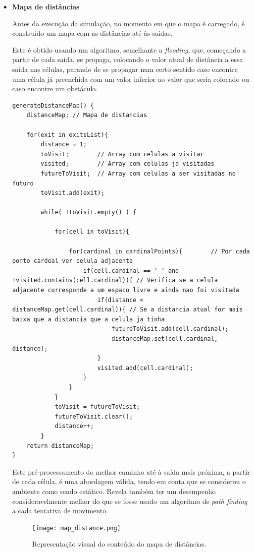 \documentclass[12pt]{article}
\begin{document}
\begin{titlepage}
\begin{itemize}
\item \textbf{Mapa de distâncias}

Antes da execução da simulação, no momento em que o mapa é carregado, é construído um mapa com as distâncias até às saídas. 

Este é obtido usando um algoritmo, semelhante a \textit{flooding}, que, começando a partir de cada saída, se propaga, colocando o valor atual de distância a essa saída nas células, parando de se propagar num certo sentido caso encontre uma célula já preenchida com um valor inferior ao valor que seria colocado ou caso encontre um obstáculo.
\newpage
\begin{lstlisting}[caption= Pseudo-código do algoritmo usado para o preenchimento do mapa de distâncias.]
generateDistanceMap() {
	distanceMap; // Mapa de distancias

	for(exit in exitsList){
		distance = 1;
		toVisit; 		// Array com celulas a visitar
		visited; 		// Array com celulas ja visitadas
		futureToVisit; 	// Array com celulas a ser visitadas no futuro
		toVisit.add(exit);

		while( !toVisit.empty() ) {

			for(cell in toVisit){
				
				for(cardinal in cardinalPoints){		// Por cada ponto cardeal ver celula adjacente
					if(cell.cardinal == ' ' and !visited.contains(cell.cardinal)){ // Verifica se a celula adjacente corresponde a um espaco livre e ainda nao foi visitada
						if(distance < distanceMap.get(cell.cardinal)){ // Se a distancia atual for mais baixa que a distancia que a celula ja tinha
							futureToVisit.add(cell.cardinal);
							distanceMap.set(cell.cardinal, distance);
						}
						visited.add(cell.cardinal);
					}
				}
			}
			toVisit = futureToVisit;
			futureToVisit.clear();
			distance++;
		}
	return distanceMap;		
}
\end{lstlisting}

Este pré-processamento do melhor caminho até à saída mais próxima, a partir de cada célula, é uma abordagem válida, tendo em conta que se considerou o ambiente como sendo estático. Revela também ter um desempenho consideravelmente melhor do que se fosse usado um algoritmo de \textit{path finding} a cada tentativa de movimento. 

\begin{figure}[H]
	\centering
	\texttt{[image: map\_distance.png]}
	\caption{Representação visual do conteúdo do mapa de distâncias\protect\footnotemark.}
	\label{map}
\end{figure}


\end{itemize}
\end{titlepage}
\end{document}
